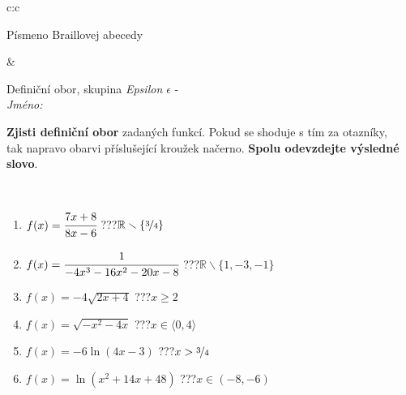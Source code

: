 \documentclass[10pt]{report}
\begin{document}
\begin{tabular}{c:c}
\begin{minipage}[c][104.5mm][t]{0.5\linewidth}
\begin{center}
\begin{minipage}{0.20\linewidth}
\begin{center}
{\small Písmeno Braillovej abecedy}
\end{center}
\end{minipage}
\end{center}
\end{minipage}
&
\begin{minipage}[c][104.5mm][t]{0.5\linewidth}
\begin{center}
\vspace{7mm}
{\huge Definiční obor, skupina \textit{Epsilon $\epsilon$} -}\\[5mm]
\textit{Jméno:}\phantom{xxxxxxxxxxxxxxxxxxxxxxxxxxxxxxxxxxxxxxxxxxxxxxxxxxxxxxxxxxxxxxxxx}\\[5mm]
\begin{minipage}{0.95\linewidth}
\begin{center}
\textbf{Zjisti definiční obor} zadaných funkcí. Pokud se shoduje s tím za otazníky,\\tak napravo obarvi příslušející kroužek načerno. \textbf{Spolu odevzdejte výsledné slovo}.
\end{center}
\end{minipage}
\\[1mm]
\begin{minipage}{0.79\linewidth}
\begin{center}
\begin{varwidth}{\linewidth}
\begin{enumerate}
\normalsizerrr
\item $f(x)=\cfrac{7x+8}{8x-6}$\quad \dotfill\; ???\;\dotfill \quad $\mathbb{R}\smallsetminus\{\nicefrac{3}{4}\}$
\item $f(x)=\cfrac{1}{-4x^3-16x^2-20x-8}$\quad \dotfill\; ???\;\dotfill \quad $\mathbb{R}\smallsetminus\{1,-3,-1\}$
\item $f(x)=-4\sqrt{2x+4}$\quad \dotfill\; ???\;\dotfill \quad $x\geq2$
\item $f(x)=\sqrt{-x^2-4x}$\quad \dotfill\; ???\;\dotfill \quad $x\in\langle0 , 4\rangle$
\item $f(x)=-6\ln{(4x-3)}$\quad \dotfill\; ???\;\dotfill \quad $x>\nicefrac{3}{4}$
\item $f(x)=\ln{(x^2+14x+48)}$\quad \dotfill\; ???\;\dotfill \quad $x\in(-8 , -6)$
\end{enumerate}
\end{varwidth}
\end{center}
\end{minipage}
\begin{minipage}{0.20\linewidth}
\begin{center}

\end{center}
\end{minipage}
\end{center}
\end{minipage}
\end{tabular}
\end{document}
